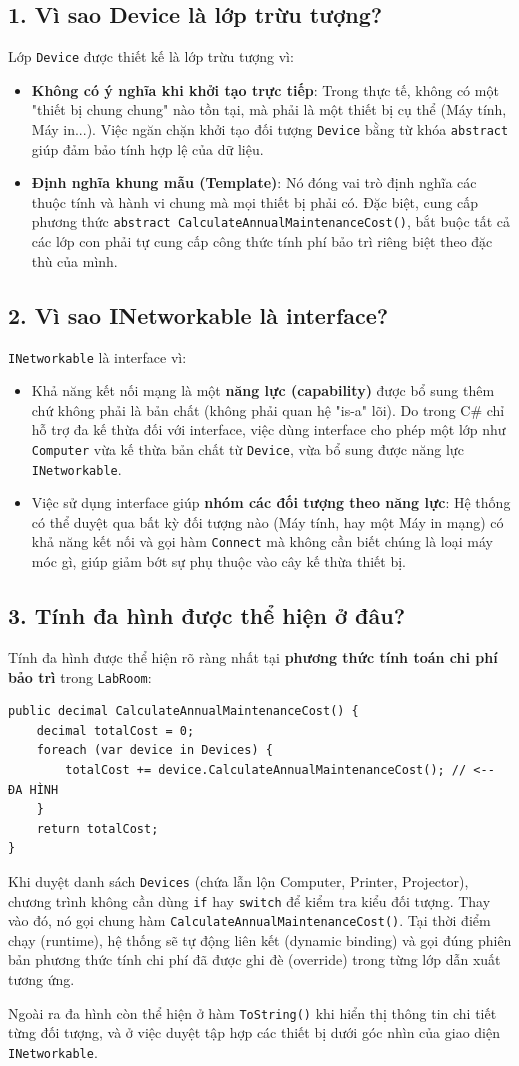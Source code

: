 \documentclass[12pt,a4paper]{article}
\begin{document}
\subsection{1. Vì sao Device là lớp trừu tượng?}
Lớp \texttt{Device} được thiết kế là lớp trừu tượng vì:
\begin{itemize}
    \item \textbf{Không có ý nghĩa khi khởi tạo trực tiếp}: Trong thực tế, không có một "thiết bị chung chung" nào tồn tại, mà phải là một thiết bị cụ thể (Máy tính, Máy in...). Việc ngăn chặn khởi tạo đối tượng \texttt{Device} bằng từ khóa \texttt{abstract} giúp đảm bảo tính hợp lệ của dữ liệu.
    \item \textbf{Định nghĩa khung mẫu (Template)}: Nó đóng vai trò định nghĩa các thuộc tính và hành vi chung mà mọi thiết bị phải có. Đặc biệt, cung cấp phương thức \texttt{abstract CalculateAnnualMaintenanceCost()}, bắt buộc tất cả các lớp con phải tự cung cấp công thức tính phí bảo trì riêng biệt theo đặc thù của mình.
\end{itemize}

\subsection{2. Vì sao INetworkable là interface?}
\texttt{INetworkable} là interface vì:
\begin{itemize}
    \item Khả năng kết nối mạng là một \textbf{năng lực (capability)} được bổ sung thêm chứ không phải là bản chất (không phải quan hệ "is-a" lõi). Do trong C\# chỉ hỗ trợ đa kế thừa đối với interface, việc dùng interface cho phép một lớp như \texttt{Computer} vừa kế thừa bản chất từ \texttt{Device}, vừa bổ sung được năng lực \texttt{INetworkable}.
    \item Việc sử dụng interface giúp \textbf{nhóm các đối tượng theo năng lực}: Hệ thống có thể duyệt qua bất kỳ đối tượng nào (Máy tính, hay một Máy in mạng) có khả năng kết nối và gọi hàm \texttt{Connect} mà không cần biết chúng là loại máy móc gì, giúp giảm bớt sự phụ thuộc vào cây kế thừa thiết bị.
\end{itemize}

\subsection{3. Tính đa hình được thể hiện ở đâu?}
Tính đa hình được thể hiện rõ ràng nhất tại \textbf{phương thức tính toán chi phí bảo trì} trong \texttt{LabRoom}:
\begin{verbatim}
public decimal CalculateAnnualMaintenanceCost() {
    decimal totalCost = 0;
    foreach (var device in Devices) {
        totalCost += device.CalculateAnnualMaintenanceCost(); // <-- ĐA HÌNH
    }
    return totalCost;
}
\end{verbatim}
Khi duyệt danh sách \texttt{Devices} (chứa lẫn lộn Computer, Printer, Projector), chương trình không cần dùng \texttt{if} hay \texttt{switch} để kiểm tra kiểu đối tượng. Thay vào đó, nó gọi chung hàm \texttt{CalculateAnnualMaintenanceCost()}. Tại thời điểm chạy (runtime), hệ thống sẽ tự động liên kết (dynamic binding) và gọi đúng phiên bản phương thức tính chi phí đã được ghi đè (override) trong từng lớp dẫn xuất tương ứng.

Ngoài ra đa hình còn thể hiện ở hàm \texttt{ToString()} khi hiển thị thông tin chi tiết từng đối tượng, và ở việc duyệt tập hợp các thiết bị dưới góc nhìn của giao diện \texttt{INetworkable}.
\end{document}
